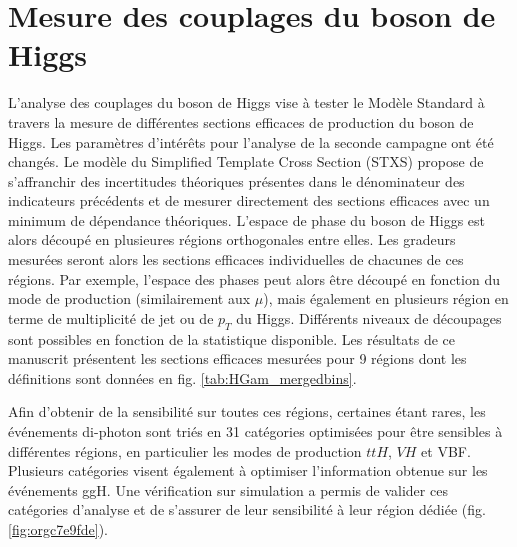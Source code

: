 \section{Mesure des couplages du boson de Higgs}

L'analyse des couplages du boson de Higgs vise à tester le Modèle Standard à travers la mesure de différentes sections efficaces de production du boson de Higgs.
Les paramètres d'intérêts pour l'analyse de la seconde campagne ont été changés.
Le modèle du  Simplified Template Cross Section (STXS) propose de s'affranchir des incertitudes théoriques présentes dans le dénominateur des indicateurs précédents et de mesurer directement des sections efficaces avec un minimum de dépendance théoriques.
L'espace de phase du boson de Higgs est alors découpé en plusieures régions orthogonales entre elles.
Les gradeurs mesurées seront alors les sections efficaces individuelles de chacunes de ces régions.
Par exemple, l'espace des phases peut alors être découpé en fonction du mode de production (similairement aux $\mu$), mais également en plusieurs région en terme de multiplicité de jet ou de $p_T$ du Higgs.
Différents niveaux de découpages sont possibles en fonction de la statistique disponible.
Les résultats de ce manuscrit  présentent les sections efficaces mesurées pour 9 régions dont les définitions sont données en fig. \ref{tab:HGam_mergedbins}.

Afin d'obtenir de la sensibilité sur toutes ces régions, certaines étant rares, les événements di-photon sont triés en 31 catégories optimisées pour être sensibles à différentes régions, en particulier les modes de production $ttH$, $VH$ et VBF.
Plusieurs catégories visent également à optimiser l'information obtenue sur les événements ggH.
Une vérification sur simulation a permis de valider ces catégories d'analyse et de s'assurer de leur sensibilité à leur région dédiée (fig. \ref{fig:orgc7e9fde}).

